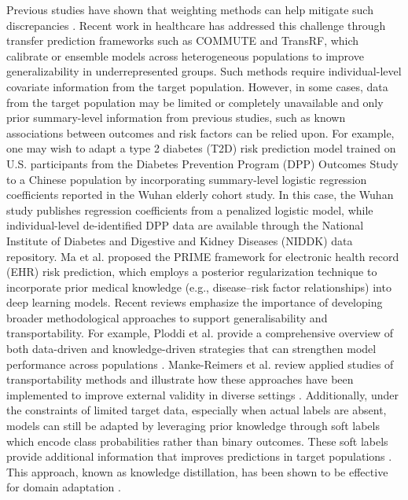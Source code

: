 \documentclass[fleqn,10pt]{wlscirep}
\begin{document}
Previous studies have shown that weighting methods can help mitigate such discrepancies \cite{ling2023overview}. Recent work in healthcare has addressed this challenge through transfer prediction frameworks such as COMMUTE\cite{gu2023commute} and TransRF\cite{gu2022transfer}, which calibrate or ensemble models across heterogeneous populations to improve generalizability in underrepresented groups. Such methods require individual-level covariate information from the target population. However, in some cases, data from the target population may be limited or completely unavailable and only prior summary-level information from previous studies, such as known associations between outcomes and risk factors can be relied upon. For example, one may wish to adapt a type 2 diabetes (T2D) risk prediction model trained on U.S. participants from the Diabetes Prevention Program (DPP) Outcomes Study \cite{diabetes2002reduction} to a Chinese population by incorporating summary-level logistic regression coefficients reported in the Wuhan elderly cohort study\cite{liu2022predicting}. In this case, the Wuhan study publishes regression coefficients from a penalized logistic model, while individual-level de-identified DPP data are available through the National Institute of Diabetes and Digestive and Kidney Diseases (NIDDK) data repository.  Ma et al.\cite{ma2018risk} proposed the PRIME framework for electronic health record (EHR) risk prediction, which employs a posterior regularization technique to incorporate prior medical knowledge (e.g., disease–risk factor relationships) into deep learning models. Recent reviews emphasize the importance of developing broader methodological approaches to support generalisability and transportability. For example, Ploddi et al. provide a comprehensive overview of both data-driven and knowledge-driven strategies that can strengthen model performance across populations \cite{ploddi2024scoping}. Manke-Reimers et al. review applied studies of transportability methods and illustrate how these approaches have been implemented to improve external validity in diverse settings \cite{manke2025and}. Additionally, under the constraints of limited target data, especially when actual labels are absent, models can still be adapted by leveraging prior knowledge through soft labels which encode class probabilities rather than binary outcomes. These soft labels provide additional information that improves predictions in target populations \cite{yao2019heterogeneous}. This approach, known as knowledge distillation, has been shown to be effective for domain adaptation \cite{hinton2015distilling,willard2022integrating}.
\end{document}
